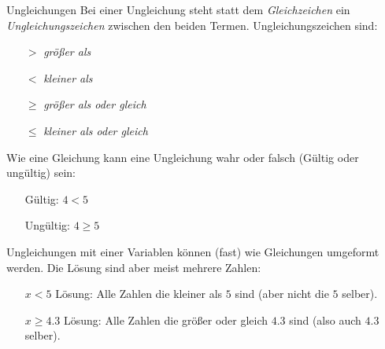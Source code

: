 \documentclass[12pt,a5paper,landscape]{scrartcl}
\begin{document}
\begin{hilfekarte}{Ungleichungen}
	Bei einer Ungleichung steht statt dem \emph{Gleichzeichen} ein \emph{Ungleichungszeichen} zwischen den beiden Termen. Ungleichungszeichen sind:
	\begin{multicols}{2}\begin{itemize}
		\item[$>$] \emph{größer als}
		\item[$<$] \emph{kleiner als}
		\item[$\geq$] \emph{größer als oder gleich}
		\item[$\leq$] \emph{kleiner als oder gleich}
	\end{itemize}\end{multicols}
	
	Wie eine Gleichung kann eine Ungleichung wahr oder falsch (Gültig oder ungültig) sein:
	\begin{multicols}{2}\begin{itemize}\centering
		\item[Gültig:] $4 < 5$
		\item[Ungültig:] $4 \geq 5$
	\end{itemize}\end{multicols}
	
	Ungleichungen mit einer Variablen können (fast) wie Gleichungen umgeformt werden. Die Lösung sind aber meist mehrere Zahlen:
	\begin{itemize}[leftmargin=2cm]
		\item[$x < 5$] Lösung: Alle Zahlen die kleiner als $5$ sind (aber nicht die $5$ selber).
		\item[$x \geq 4.3$] Lösung: Alle Zahlen die größer oder gleich $4.3$ sind (also auch $4.3$ selber).
	\end{itemize}
\end{hilfekarte}
\end{document}
